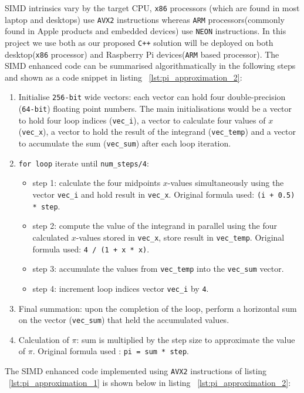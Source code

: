 SIMD intrinsics vary by the target CPU, \texttt{x86} processors (which are found in most laptop and desktops) use \texttt{AVX2} instructions whereas \texttt{ARM} processors(commonly found in Apple products and embedded devices) use \texttt{NEON} instructions. In this project we use both as our proposed \texttt{C++} solution will be deployed on both desktop(\texttt{x86} processor) and Raspberry Pi devices(\texttt{ARM} based processor). The SIMD enhanced code can be summarised algorithmatically in the following steps and shown as a code snippet in listing ~\ref{lst:pi_approximation_2}: 

\begin{enumerate}
	\item Initialise \texttt{256-bit} wide vectors: each vector can hold four double-precision (\texttt{64-bit}) floating point numbers. The main initialisations would be a vector to hold four loop indices (\texttt{vec\_i}), a vector to calculate four values of $x$ (\texttt{vec\_x}), a vector to hold the result of the integrand (\texttt{vec\_temp}) and a vector to accumulate the sum (\texttt{vec\_sum}) after each loop iteration.
	\item \texttt{for loop} iterate until \texttt{num\_steps/4}:
	\begin{itemize}
		\item step 1: calculate the four midpoints $x$-values simultaneously using the vector \texttt{vec\_i} and hold result in \texttt{vec\_x}. Original formula used: \texttt{(i + 0.5) * step}.
		\item step 2: compute the value of the integrand in parallel using the four calculated $x$-values stored in \texttt{vec\_x}, store result in \texttt{vec\_temp}. Original formula used: \texttt{4 / (1 + x * x)}.
		\item step 3: accumulate the values from \texttt{vec\_temp} into the \texttt{vec\_sum} vector.
		\item step 4: increment loop indices vector \texttt{vec\_i} by \texttt{4}. 
	\end{itemize}
	\item Final summation: upon the completion of the loop, perform a horizontal sum on the vector (\texttt{vec\_sum}) that held the accumulated values.
	\item Calculation of $\pi$: sum is multiplied by the step size to approximate the value of $\pi$. Original formula used : \texttt{pi = sum * step}.
\end{enumerate}

The SIMD enhanced code implemented using \texttt{AVX2} instructions of listing ~\ref{lst:pi_approximation_1} is shown below in listing ~\ref{lst:pi_approximation_2}: 

